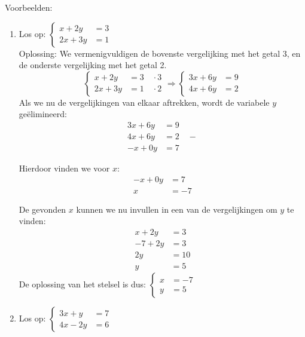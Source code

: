 Voorbeelden:
\begin{enumerate}
    \item Los op:
    $\begin{cases}
       x+2y &=3 \\
       2x+3y &=1 
    \end{cases}$ \\
    Oplossing: We vermenigvuldigen de bovenste vergelijking met het getal 3, en de onderste vergelijking met het getal 2.
    \[
    \begin{cases}
    x+2y&=3 \quad \cdot 3 \\
    2x+3y&=1 \quad \cdot 2     
    \end{cases} \Rightarrow
    \begin{cases}
        3x+6y&=9 \\
        4x+6y&=2
    \end{cases}
    \]
    Als we nu de vergelijkingen van elkaar aftrekken, wordt de variabele $y$ ge\"elimineerd:
    \begin{align*}
    3x + 6y &= 9 \\
    4x + 6y &= 2 \quad -\\
    \hline 
    -x + 0y &= 7
    \end{align*}

    Hierdoor vinden we voor $x$:
    \begin{align*}
        -x+0y&=7 \\
        x&=-7
    \end{align*}

    De gevonden $x$ kunnen we nu invullen in een van de vergelijkingen om $y$ te vinden:
    \begin{align*}
        x+2y&=3  \\
        -7+2y&=3 \\
        2y&=10   \\
        y&=5        
    \end{align*}
    De oplossing van het stelsel is dus: 
    $\begin{cases}
        x&=-7 \\
        y&=5
    \end{cases}$ \\

    \item 	Los op:
    $\begin{cases}
      3x+y&=7 \\
      4x-2y&=6
    \end{cases}$
\end{enumerate}

